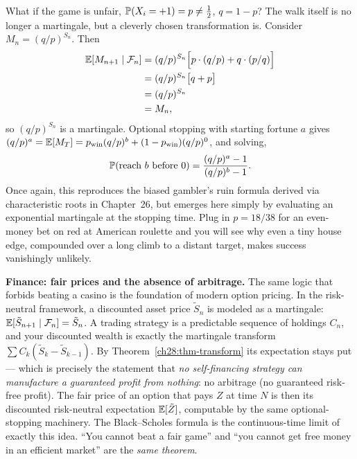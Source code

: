 \begin{example}
\label{ch28:ex-biased}
What if the game is unfair, $\P(X_i = +1) = p \ne \tfrac12$, $q = 1-p$? The walk itself is no longer a
martingale, but a cleverly chosen transformation is. Consider $M_n = (q/p)^{S_n}$. Then
\begin{align*}
  \E[M_{n+1}\given\mathcal{F}_n] &= (q/p)^{S_n}\Big[p\cdot(q/p) + q\cdot(p/q)\Big] \\
  &= (q/p)^{S_n}\big[q + p\big] \\
  &= (q/p)^{S_n} \\
  &= M_n,
\end{align*}
so $(q/p)^{S_n}$ is a martingale. Optional stopping with starting fortune $a$ gives
$(q/p)^a = \E[M_T] = p_{\text{win}}(q/p)^b + (1-p_{\text{win}})(q/p)^0$, and solving,
\[
  \P(\text{reach } b \text{ before } 0) = \frac{(q/p)^a - 1}{(q/p)^b - 1}.
\]
Once again, this reproduces the biased gambler's ruin formula derived via characteristic roots in
Chapter~26, but emerges here simply by evaluating an exponential martingale at the stopping
time. Plug in $p = 18/38$ for an even-money bet on red at American roulette and you will see why even a
tiny house edge, compounded over a long climb to a distant target, makes success vanishingly unlikely.

\end{example}

\begin{applicationbox}
\textbf{Finance: fair prices and the absence of arbitrage.} The same logic that forbids beating a
casino is the foundation of modern option pricing. In the risk-neutral framework, a discounted asset
price $\tilde{S}_n$ is modeled as a martingale: $\E[\tilde{S}_{n+1}\given\mathcal{F}_n] =
\tilde{S}_n$. A trading strategy is a predictable sequence of holdings $C_n$, and your discounted
wealth is exactly the martingale transform $\sum C_k(\tilde{S}_k - \tilde{S}_{k-1})$. By
Theorem~\ref{ch28:thm-transform} its expectation stays put --- which is precisely the statement that
\emph{no self-financing strategy can manufacture a guaranteed profit from nothing}: no arbitrage (no guaranteed risk-free profit). The
fair price of an option that pays $Z$ at time $N$ is then its discounted risk-neutral expectation
$\E[\tilde{Z}]$, computable by the same optional-stopping machinery. The Black--Scholes formula is the
continuous-time limit of exactly this idea. ``You cannot beat a fair game'' and ``you cannot get free
money in an efficient market'' are the \emph{same theorem}.
\end{applicationbox}

